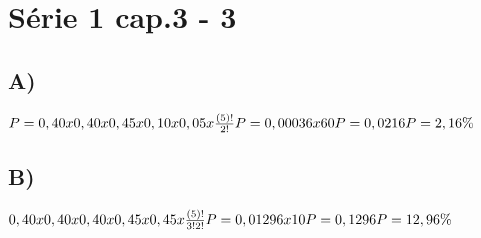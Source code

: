 \section*{Série 1 cap.3 - 3}

    \subsection*{A)}
    $P = 0,40 x 0,40 x 0,45 x 0,10 x 0,05 x \frac{(5)!}{2!}
    \newline
    P = 0,00036 x 60
    \newline
    P = 0,0216 
    \newline
    P = 2,16\%$
    
    \subsection*{B)}
    $0,40 x 0,40 x 0,40 x 0,45 x 0,45 x \frac{(5)!}{3!2!}
    \newline
    P = 0,01296 x 10
    \newline
    P = 0,1296
    \newline
    P = 12,96\%$
